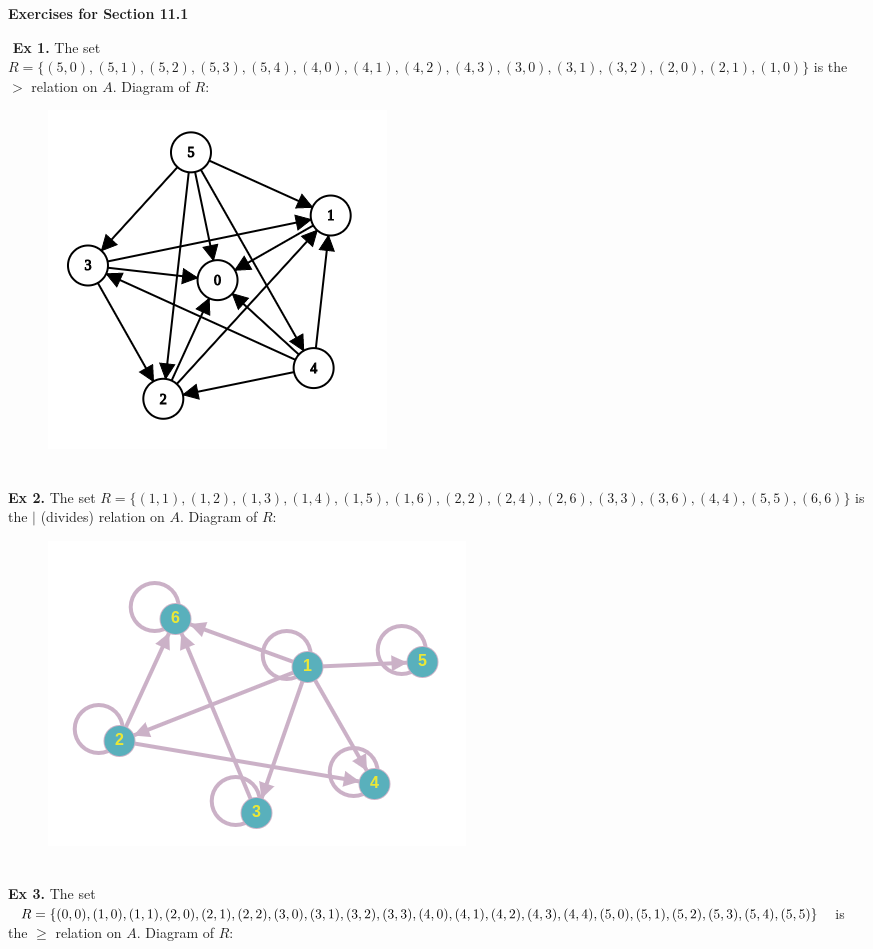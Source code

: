 \documentclass{article}
\date{}
\author{}
\begin{document}
\centerline{\textbf{Exercises for Section 11.1}}
$ $\newline
\textbf{Ex 1.} The set $R= \{(5,0),(5,1),(5,2),(5,3),(5,4),(4,0),(4,1),(4,2),(4,3),(3,0),(3,1), (3,2),(2,0),(2,1),(1,0) \}$ is the $>$ relation on $A$. Diagram of $R$:
\begin{figure}[h]
\centering
\includegraphics[scale=0.5]{1.png}
\end{figure}\\
\textbf{Ex 2.} The set $R= \{(1,1), (1,2), (1,3), (1,4), (1,5), (1,6), (2,2), (2,4), (2,6), (3,3), (3,6), (4,4), (5,5), (6,6) \}$ is the $|$ (divides) relation on $A$. Diagram of $R$:
\begin{figure}[h]
\centering
\includegraphics[scale=0.6]{2.png}
\end{figure}\\
\newpage
\noindent \textbf{Ex 3.} The set $R= \{(0,0), (1, 0), (1, 1), (2, 0), (2,1), (2,2), (3,0), (3,1), (3,2), (3,3), (4, 0), (4,1), (4,2), (4,3), (4,4),\\ (5, 0), (5,1), (5,2), (5,3), (5,4), (5,5) \}$ is the $\geq$ relation on $A$. Diagram of $R$:
\end{document}
